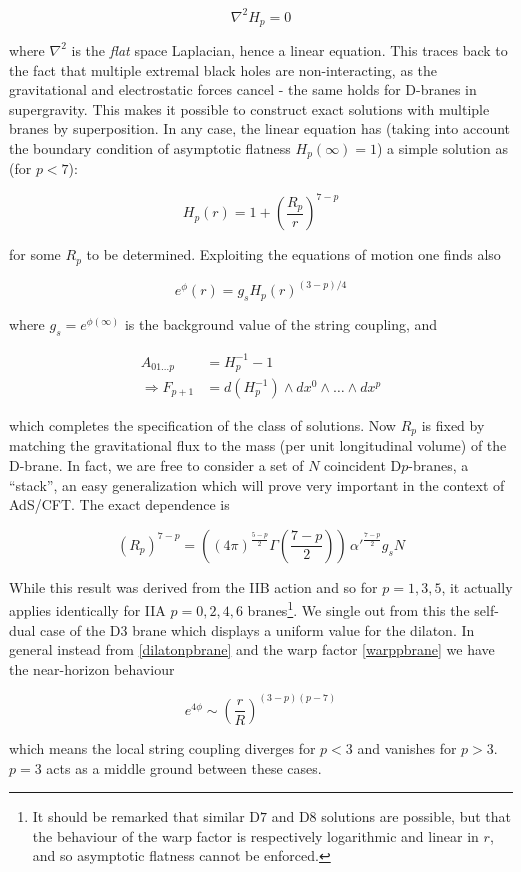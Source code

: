 \begin{equation}
	\nabla^2 H_p = 0
	\label{}
\end{equation}

where $\nabla^2$ is the \emph{flat} space Laplacian, hence a linear equation. This traces back to the fact that multiple extremal black holes are non-interacting, as the gravitational and electrostatic forces cancel - the same holds for D-branes in supergravity. This makes it possible to construct exact solutions with multiple branes by superposition. In any case, the linear equation has (taking into account the boundary condition of asymptotic flatness $H_p(\infty) = 1$) a simple solution as (for $p<7$):

\begin{equation}
	H_p(r) = 1 + \left( \frac{R_p}{r} \right)^{7-p}
	\label{warppbrane}
\end{equation}

for some $R_p$ to be determined. Exploiting the equations of motion one finds also

\begin{equation}
	e^\phi(r) = g_s H_p(r)^{(3-p)/4}
	\label{dilatonpbrane}
\end{equation}

where $g_s = e^{\phi(\infty)}$ is the background value of the string coupling, and

\begin{align}
	A_{01\ldots p} &= H_p^{-1} - 1  \\\Rightarrow
	F_{p+1} &= d(H_p^{-1}) \wedge dx^0 \wedge \ldots \wedge dx^p
	\label{}
\end{align}

which completes the specification of the class of solutions. Now $R_p$ is fixed by matching the gravitational flux to the mass (per unit longitudinal volume) of the D-brane. In fact, we are free to consider a set of $N$ coincident D$p$-branes, a ``stack'', an easy generalization which will prove very important in the context of AdS/CFT. The exact dependence is

\begin{equation}
	(R_p)^{7-p} =\left( (4\pi)^{\frac{5-p}{2}} \Gamma\left(\frac{7-p}{2}\right) \right) \, \alpha'^{\frac{7-p}{2}} g_s N
	\label{}
\end{equation}

While this result was derived from the IIB action and so for $p=1,3,5$, it actually applies identically for IIA $p=0,2,4,6$ branes\footnote{It should be remarked that similar D$7$ and D$8$ solutions are possible, but that the behaviour of the warp factor is respectively logarithmic and linear in $r$, and so asymptotic flatness cannot be enforced.}. We single out from this the self-dual case of the D$3$ brane which displays a uniform value for the dilaton. In general instead from \eqref{dilatonpbrane} and the warp factor \eqref{warppbrane} we have the near-horizon behaviour

\begin{equation}
	e^{4\phi} \sim \left( \frac{r}{R} \right)^{(3-p)(p-7)}
	\label{}
\end{equation}

which means the local string coupling diverges for $p<3$ and vanishes for $p>3$. $p=3$ acts as a middle ground between these cases.
